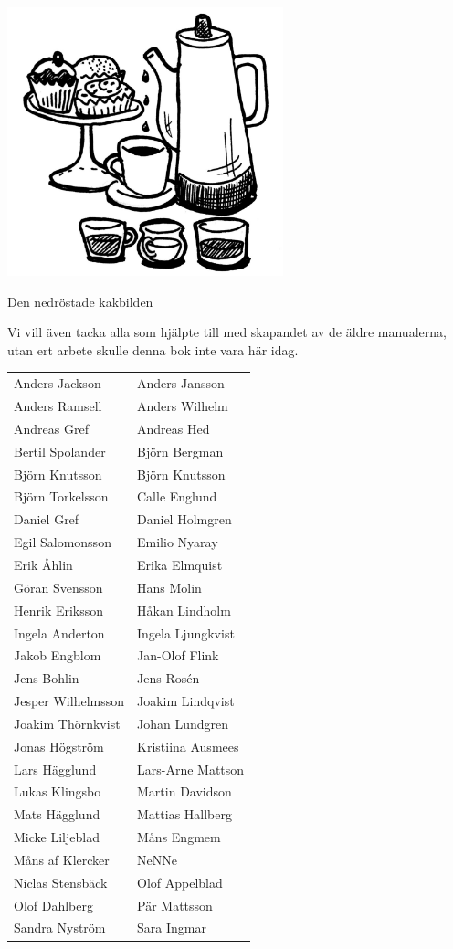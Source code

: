 \documentclass[a6paper,fontsize=10pt,twoside,open=right]{scrbook}
\begin{document}
\vfill
\begin{center}
  \noindent\includegraphics[keepaspectratio,width=0.6\textwidth]{elements/punsch1.jpg}\par
  \noindent\footnotesize{Den nedröstade kakbilden}
\end{center}
\vfill
\null
\newpage
Vi vill även tacka alla som hjälpte till med skapandet av de äldre
manualerna, utan ert arbete skulle denna bok inte vara här idag.\par
\vspace{10pt}
\begin{tabular}{@{}p{}p{}@{}}
  Anders Jackson & Anders Jansson\\
  Anders Ramsell & Anders Wilhelm\\
  Andreas Gref & Andreas Hed\\
  Bertil Spolander & Björn Bergman\\
  Björn Knutsson & Björn Knutsson\\
  Björn Torkelsson & Calle Englund\\
  Daniel Gref & Daniel Holmgren\\
  Egil Salomonsson & Emilio Nyaray\\
  Erik Åhlin & Erika Elmquist\\
  Göran Svensson & Hans Molin\\
  Henrik Eriksson & Håkan Lindholm\\
  Ingela Anderton & Ingela Ljungkvist\\
  Jakob Engblom & Jan-Olof Flink\\
  Jens Bohlin & Jens Rosén\\
  Jesper Wilhelmsson & Joakim Lindqvist\\
  Joakim Thörnkvist & Johan Lundgren\\
  Jonas Högström & Kristiina Ausmees\\
  Lars Hägglund & Lars-Arne Mattson\\
  Lukas Klingsbo & Martin Davidson\\
  Mats Hägglund & Mattias Hallberg\\
  Micke Liljeblad & Måns Engmem\\
  Måns af Klercker & NeNNe\\
  Niclas Stensbäck & Olof Appelblad\\
  Olof Dahlberg & Pär Mattsson\\
  Sandra Nyström & Sara Ingmar
\end{tabular}
\newpage
{}
\end{document}
